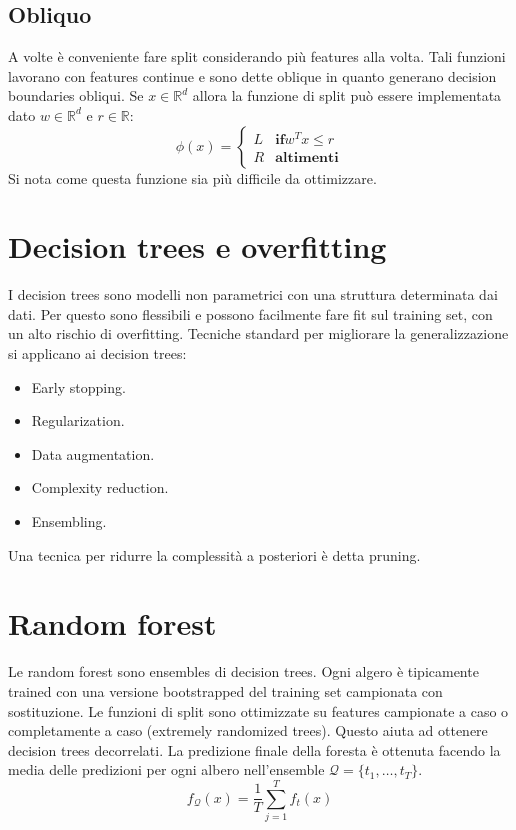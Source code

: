 	\subsection{Obliquo}
	A volte \`e conveniente fare split considerando pi\`u features alla volta.
	Tali funzioni lavorano con features continue e sono dette oblique in quanto generano decision boundaries obliqui.
	Se $x\in\mathbb{R}^d$ allora la funzione di split pu\`o essere implementata dato $w\in\mathbb{R}^d$ e $r\in\mathbb{R}$:
	$$\phi(x) = \begin{cases}L &\mathbf{if} w^Tx\le r\\
		 								  R &\mathbf{altimenti}
			 	\end{cases}$$
	Si nota come questa funzione sia pi\`u difficile da ottimizzare.

\section{Decision trees e overfitting}
I decision trees sono modelli non parametrici con una struttura determinata dai dati.
Per questo sono flessibili e possono facilmente fare fit sul training set, con un alto rischio di overfitting.
Tecniche standard per migliorare la generalizzazione si applicano ai decision trees:
\begin{multicols}{2}
	\begin{itemize}
		\item Early stopping.
		\item Regularization.
		\item Data augmentation.
		\item Complexity reduction.
		\item Ensembling.
	\end{itemize}
\end{multicols}
Una tecnica per ridurre la complessit\`a a posteriori \`e detta pruning.

\section{Random forest}
Le random forest sono ensembles di decision trees.
Ogni algero \`e tipicamente trained con una versione bootstrapped del training set campionata con sostituzione.
Le funzioni di split sono ottimizzate su features campionate a caso o completamente a caso (extremely randomized trees).
Questo aiuta ad ottenere decision trees decorrelati.
La predizione finale della foresta \`e ottenuta facendo la media delle predizioni per ogni albero nell'ensemble $\mathcal{Q}=\{t_1,\dots,t_T\}$.
$$f_\mathcal{Q}(x)=\dfrac{1}{T}\sum\limits_{j=1}^Tf_t(x)$$
